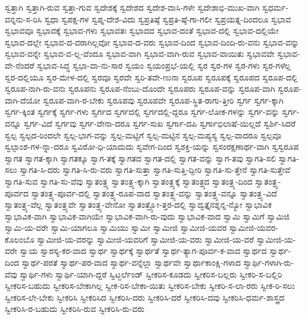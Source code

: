 {ಸ್ವತ್ತಾಗಿ
ಸ್ವತ್ತಾಗಿ-ರುವ
ಸ್ವತ್ತಾ-ಗುವ
ಸ್ವದೇಶಕ್ಕೆ
ಸ್ವದೇಶದ
ಸ್ವದೇಶ-ವಾಸಿ-ಗಳೇ
ಸ್ವದೇಶಾಭಿ-ಮುಖ-ವಾಗಿ
ಸ್ವಧರ್ಮ-ವನ್ನನು-ಸ-ರಿಸಿ
ಸ್ವಧಾ
ಸ್ವಪಕ್ಷ-ಗಳ
ಸ್ವಪ್ನ-ದೇಶ-ವಿದು
ಸ್ವಪ್ರತಿಷ್ಠೆ
ಸ್ವಪ್ರತಿ-ಷ್ಠೆ-ಗಾ-ಗಲೀ
ಸ್ವಪ್ರಯತ್ನ-ದಿಂದಲೂ
ಸ್ವಭಾವ
ಸ್ವಭಾವವೂ
ಸ್ವಭಾವಕ್ಕೆ
ಸ್ವಭಾವ-ಗಳು
ಸ್ವಭಾವತಃ
ಸ್ವಭಾವದ
ಸ್ವಭಾವ-ದಂತೆ
ಸ್ವಭಾವ-ದಲ್ಲಿ
ಸ್ವಭಾವ-ದಲ್ಲಿಯೇ
ಸ್ವಭಾವ-ದಲ್ಲೇ
ಸ್ವಭಾವ-ದ-ವರಾಗಿಲ್ಲವೋ
ಸ್ವಭಾವ-ದ-ವರು
ಸ್ವಭಾವ-ದಿಂದ
ಸ್ವಭಾವ-ದಿಂದಿ-ರು-ವನು
ಸ್ವಭಾವ-ವನ್ನು
ಸ್ವಭಾವ-ವನ್ನೇ
ಸ್ವಭಾವ-ವ-ಲ್ಲ-ವೆಂದೂ
ಸ್ವಭಾವ-ವಾಗಿ
ಸ್ವಭಾವ-ವಾಗಿ-ರುವ
ಸ್ವಭಾವ-ವಾಯಿತು
ಸ್ವಭಾವವೇ
ಸ್ವಭಾವ-ವೇ-ನೆಂದರೆ
ಸ್ವಭಾವ-ಸಿದ್ಧ
ಸ್ವಭಾ-ವಾ-ನು-ಸಾರ
ಸ್ವಯಂ
ಸ್ವಯಂಪ್ರಭೆ-ಯಲ್ಲಿ
ಸ್ವರ
ಸ್ವರ-ಗಳ
ಸ್ವರ-ಗಳು
ಸ್ವರ-ಗಳೆಲ್ಲ
ಸ್ವರ-ದಲ್ಲಿಯೂ
ಸ್ವರ-ಮೇಳ-ದಲ್ಲಿ
ಸ್ವರವೂ
ಸ್ವರವೇ
ಸ್ವರಿ-ತವೇ-ಣುನಾ
ಸ್ವರೂಪ
ಸ್ವರೂಪಕ್ಕೆ
ಸ್ವರೂಪದ
ಸ್ವರೂಪ-ದಲ್ಲಿ
ಸ್ವರೂಪ-ನಾಗಿ-ರು-ವನು
ಸ್ವರೂಪನು
ಸ್ವರೂಪ-ನೆಂಬು-ದೊಂದೇ
ಸ್ವರೂಪರು
ಸ್ವರೂಪ-ವನ್ನು
ಸ್ವರೂಪ-ವಾಗಿ
ಸ್ವರೂಪ-ವಾಗಿ-ದೆಯೋ
ಸ್ವರೂಪ-ವಾಗಿ-ರ-ಬೇಕು
ಸ್ವರೂಪವು
ಸ್ವರೂಪವೇ
ಸ್ವರೂಪ-ಸ್ಥಿತ-ರಾಗು-ತ್ತೀರಿ
ಸ್ವರ್ಗ
ಸ್ವರ್ಗ-ಕ್ಕಾಗಿ
ಸ್ವರ್ಗ-ಕ್ಕಿಂತ
ಸ್ವರ್ಗಕ್ಕೆ
ಸ್ವರ್ಗ-ಗಳು
ಸ್ವರ್ಗದ
ಸ್ವರ್ಗದಲ್ಲಿ
ಸ್ವರ್ಗದಲ್ಲಿ-ದ್ದರೂ
ಸ್ವರ್ಗ-ಲೋಕ-ಗಳನ್ನು
ಸ್ವರ್ಗ-ವನ್ನು
ಸ್ವರ್ಗ-ವನ್ನೂ
ಸ್ವರ್ಗ-ವಿದೆ
ಸ್ವರ್ಗವು
ಸ್ವರ್ಗ-ವೇನಾ-ದರೂ
ಸ್ವರ್ಗ-ಸುಖ
ಸ್ವರ್ಗಾ-ದಪಿ
ಸ್ವರ್ಗಾಭಿಲಾಷೆ-ಯಿಲ್ಲದೆ
ಸ್ವರ್ಶಿ-ಸಿದರೆ
ಸ್ವಲ್ಪ
ಸ್ವಲ್ಪದ-ರಿಂದಲೇ
ಸ್ವಲ್ಪ-ಭಾಗ-ವನ್ನು
ಸ್ವಲ್ಪ-ಮಟ್ಟಿಗೆ
ಸ್ವಲ್ಪ-ಮಟ್ಟಿನ
ಸ್ವಲ್ಪ-ಮಪ್ಯಸ್ಯ
ಸ್ವಲ್ಪ-ವಾದರೂ
ಸ್ವಲ್ಪವೂ
ಸ್ವಲ್ಪಾಂಶ-ಗಳ-ನ್ನಾ-ದರೂ
ಸ್ವವಿರೋ-ಧಿ-ಯಾದುದು
ಸ್ವವೇಗ-ದಿಂದ
ಸ್ವಶಕ್ತಿ-ಯನ್ನು
ಸ್ವಸಂರಕ್ಷಣಾರ್ಥ-ವಾಗಿ
ಸ್ವಸ್ವರೂಪ
ಸ್ವಾಗತ
ಸ್ವಾಗತ-ಕ್ಕಾಗಿ
ಸ್ವಾಗತಕ್ಕೂ
ಸ್ವಾಗ-ತಕ್ಕೆ
ಸ್ವಾಗತದ
ಸ್ವಾಗತ-ದಲ್ಲಿ
ಸ್ವಾಗತ-ವನ್ನು
ಸ್ವಾಗ-ತವು
ಸ್ವಾಗತಿ-ಸಲಿ
ಸ್ವಾಗತಿ-ಸಲು
ಸ್ವಾಗತಿ-ಸಿ-ದರು
ಸ್ವಾಗತಿ-ಸಿ-ರು-ವರು
ಸ್ವಾಗತಿ-ಸುತ್ತಾ
ಸ್ವಾಗತಿ-ಸುತ್ತಿ-ದ್ದೀರಿ
ಸ್ವಾಗತಿ-ಸು-ತ್ತೇನೆ
ಸ್ವಾಗತಿ-ಸುತ್ತೇವೆ
ಸ್ವಾಗತಿ-ಸುವ
ಸ್ವಾಗತಿ-ಸು-ವೆವು
ಸ್ವಾತಂತ್ರ್ಯ
ಸ್ವಾತಂತ್ರ್ಯ-ಕ್ಕಾಗಿ
ಸ್ವಾತಂತ್ರ್ಯಕ್ಕೆ
ಸ್ವಾತಂತ್ರ್ಯದ
ಸ್ವಾತಂತ್ರ್ಯ-ದಿಂದ
ಸ್ವಾತಂತ್ರ್ಯ-ಪೂರ್ವದ
ಸ್ವಾತಂತ್ರ್ಯ-ಪೂರ್ವ-ದಲ್ಲಿ
ಸ್ವಾತಂತ್ರ್ಯ-ರೂಪ-ವಾದ
ಸ್ವಾತಂತ್ರ್ಯ-ವನ್ನು
ಸ್ವಾತಂತ್ರ್ಯ-ವನ್ನೂ
ಸ್ವಾತಂತ್ರ್ಯ-ವಿದೆ
ಸ್ವಾತಂತ್ರ್ಯ-ವೆಲ್ಲ
ಸ್ವಾತಂತ್ರ್ಯವೇ
ಸ್ವಾತಂತ್ರ್ಯ-ವೇನೋ
ಸ್ವಾತಂತ್ರ್ಯೋ-ತ್ತರ-ದಲ್ಲಿ
ಸ್ವಾದ್ವತ್ತೈನಶ್ನನ್ನ-ನ್ಯೋ
ಸ್ವಾಭಾವಿಕ
ಸ್ವಾಭಾವಿಕ-ವಾಗಿ
ಸ್ವಾಭಾವಿಕ-ವಾಗಿಯೇ
ಸ್ವಾಭಾವಿಕ-ವಾಗಿ-ರು-ವುದು
ಸ್ವಾಭಾವಿಕ-ವಾದ
ಸ್ವಾಮಿ
ಸ್ವಾಮಿಗೆ
ಸ್ವಾಮಿಜಿ
ಸ್ವಾಮಿ-ಯ-ವರೇ
ಸ್ವಾಮಿ-ಯಾಗಲೂ
ಸ್ವಾಮಿಯು
ಸ್ವಾಮೀ
ಸ್ವಾಮೀಜಿ
ಸ್ವಾಮೀಜಿ-ಯವರ
ಸ್ವಾಮೀಜಿ-ಯವರ-ಕೊಲಂಬೊ
ಸ್ವಾಮೀಜಿ-ಯ-ವರನ್ನು
ಸ್ವಾಮೀಜಿ-ಯವರಿಗೆ
ಸ್ವಾಮೀಜಿ-ಯ-ವರು
ಸ್ವಾಮೀಜಿ-ಯ-ವರೆ
ಸ್ವಾಮೀಜಿ-ಯ-ವರೇ
ಸ್ವಾಯ
ಸ್ವಾರಸ್ಯ-ಕರ-ವಾದ
ಸ್ವಾರ್ಥ
ಸ್ವಾರ್ಥಕ್ಕೆ
ಸ್ವಾರ್ಥತೆ
ಸ್ವಾರ್ಥ-ತ್ಯಾಗ-ಪೂರ್ವ-ಕ-ವಾದ
ಸ್ವಾರ್ಥದ
ಸ್ವಾರ್ಥ-ದಿಂದ
ಸ್ವಾರ್ಥ-ಪರತೆ
ಸ್ವಾರ್ಥ-ಪರ-ವಾದ
ಸ್ವಾರ್ಥ-ವನ್ನೆಲ್ಲಾ
ಸ್ವಾರ್ಥವೇ
ಸ್ವಾರ್ಥಾಕಾಂಕ್ಷಿ-ಗಳಾದ
ಸ್ವಾರ್ಥಿ-ಗಳಾಗಿ-ರು-ವೆವು
ಸ್ವಾರ್ಥಿ-ಗಳು
ಸ್ವಾರ್ಥಿ-ಯಾಗಿ-ದ್ದರೆ
ಸ್ವಿಟ್ಜರ್ಲೆಂಡ್
ಸ್ವೀಕರಿಸ-ಕೂಡದು
ಸ್ವೀಕರಿಸ-ಬಲ್ಲರು
ಸ್ವೀಕರಿ-ಸ-ಬಲ್ಲಿರಿ
ಸ್ವೀಕರಿಸ-ಬಹುದು
ಸ್ವೀಕರಿಸ-ಬೇಕಾಗಿಲ್ಲ
ಸ್ವೀಕ-ರಿಸ-ಬೇಕಾ-ಯಿತು
ಸ್ವೀಕರಿಸ-ಬೇಕು
ಸ್ವೀಕರಿ-ಸ-ಲಾ-ರರು
ಸ್ವೀಕ-ರಿ-ಸಲು
ಸ್ವೀಕರಿಸ-ಲೇ-ಬೇಕು
ಸ್ವೀಕರಿಸಿ
ಸ್ವೀಕರಿಸಿದ
ಸ್ವೀಕರಿಸಿ-ದರು
ಸ್ವೀಕರಿಸಿ-ದರೆ
ಸ್ವೀಕರಿಸಿ-ದವು
ಸ್ವೀಕರಿಸಿ-ಧರ್ಮ-ಶಾಸ್ತ್ರದ
ಸ್ವೀಕರಿಸಿ-ರ-ಬಹುದು
ಸ್ವೀಕರಿಸಿ-ರುವ
ಸ್ವೀಕರಿಸಿ-ರು-ವರು
}
